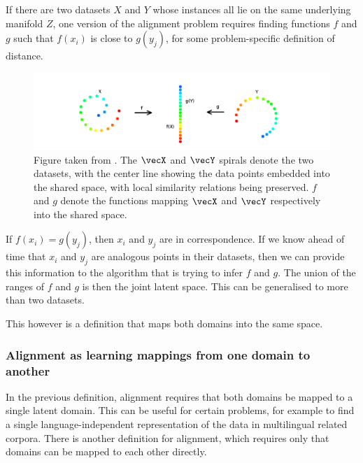 If there are two datasets $X$ and $Y$ whose instances all lie on the same underlying manifold $Z$, one version of the alignment problem requires finding functions $f$ and $g$ such that $f(x_i)$ is close  to $g(y_j)$, for some problem-specific definition of distance.

\begin{figure}[H]
    \centering
    \includegraphics[width=\textwidth]{images/review/alignment.png}
    \caption{
        Figure taken from \cite{ManifoldLearningTheoryAndApplications}. The $\vecX$ and $\vecY$ spirals denote the two datasets, with the center line showing the data points embedded into the shared space, with local similarity relations being preserved. $f$ and $g$ denote the functions mapping $\vecX$ and $\vecY$ respectively into the shared space. 
    }
\end{figure}

If $f(x_i) = g(y_j)$, then $x_i$ and $y_j$ are in correspondence. If we know ahead of time that $x_i$ and $y_j$ are analogous points in their datasets, then we can provide this information to the algorithm that is trying to infer $f$ and $g$. The union of the ranges of $f$ and $g$ is then the joint latent space. This can be generalised to more than two datasets. 

This however is a definition that maps both domains into the same space. 

\newpage
\subsubsection{Alignment as learning mappings from one domain to another}

In the previous definition, alignment requires that both domains be mapped to a single latent domain. This can be useful for certain problems, for example to find a single language-independent representation of the data in multilingual related corpora. There is another definition for alignment, which requires only that domains can be mapped to each other directly. 


